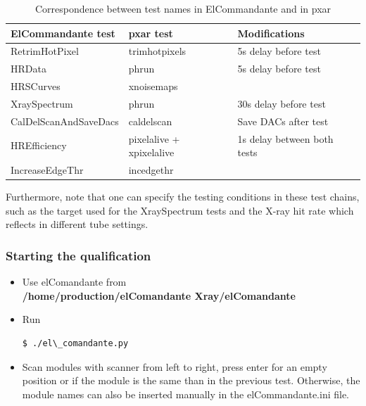 \documentclass[a4paper,12pt,twoside]{article}
\begin{document}
\begin{itemize}
\begin{table}[]
\centering
\caption{Correspondence between test names in ElCommandante and in pxar}
\label{tests}
\begin{tabular}{@{}lll@{}}
\toprule
ElCommandante test    & pxar test                & Modifications               \\ \midrule
RetrimHotPixel        & trimhotpixels            & 5s delay before test        \\
HRData                & phrun                    & 5s delay before test        \\
HRSCurves             & xnoisemaps\footnotemark             &                             \\
XraySpectrum          & phrun                    & 30s delay before test       \\
CalDelScanAndSaveDacs & caldelscan\footnotemark[\value{footnote}]               & Save DACs after test        \\
HREfficiency          & pixelalive + xpixelalive\footnotemark[\value{footnote}] & 1s delay between both tests \\
IncreaseEdgeThr       & incedgethr               &                             \\ \bottomrule
\end{tabular}
\end{table}



Furthermore, note that one can specify the testing conditions in these test chains, such as the target used for the XraySpectrum tests and the X-ray hit rate which reflects in different tube settings.



\end{itemize}
\subsubsection{Starting the qualification}

\begin{itemize}
\item Use elComandante from \\

\textbf{/home/production/elComandante{\color{Red} Xray}/elComandante}
\item Run \begin{verbatim}
$ ./el\_comandante.py
\end{verbatim}
\item Scan modules with scanner from left to right, press enter for an empty position or if the module is the same than in the previous test. Otherwise, the module names can also be inserted manually in the elCommandante.ini file.
\end{itemize}
\end{document}
